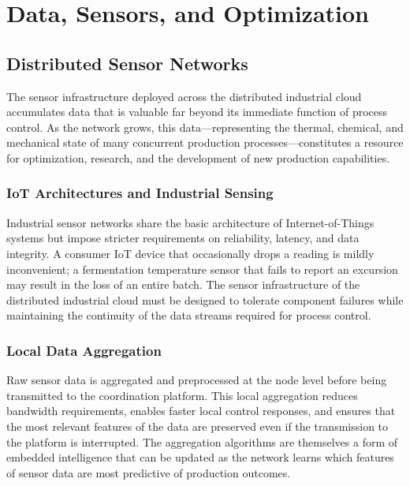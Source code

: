 \documentclass[12pt]{book}
\theoremstyle{definition}
\theoremstyle{remark}
\begin{document}
\part{Data, Sensors, and Optimization}

\chapter{Distributed Sensor Networks}

The sensor infrastructure deployed across the distributed industrial
cloud accumulates data that is valuable far beyond its immediate
function of process control. As the network grows, this
data---representing the thermal, chemical, and mechanical state of
many concurrent production processes---constitutes a resource for
optimization, research, and the development of new production
capabilities.

\section{IoT Architectures and Industrial Sensing}

Industrial sensor networks share the basic architecture of
Internet-of-Things systems but impose stricter requirements on
reliability, latency, and data integrity. A consumer IoT device
that occasionally drops a reading is mildly inconvenient; a
fermentation temperature sensor that fails to report an excursion
may result in the loss of an entire batch. The sensor infrastructure
of the distributed industrial cloud must be designed to tolerate
component failures while maintaining the continuity of the data
streams required for process control.

\section{Local Data Aggregation}

Raw sensor data is aggregated and preprocessed at the node level
before being transmitted to the coordination platform. This local
aggregation reduces bandwidth requirements, enables faster local
control responses, and ensures that the most relevant features of
the data are preserved even if the transmission to the platform is
interrupted. The aggregation algorithms are themselves a form of
embedded intelligence that can be updated as the network learns
which features of sensor data are most predictive of production
outcomes.
\end{document}
